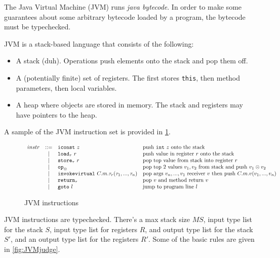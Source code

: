 \documentclass{article}
\begin{document}
The Java Virtual Machine (JVM) runs \textit{java bytecode}. In order to make some guarantees about some arbitrary bytecode loaded by a program, the bytecode must be typechecked.

\begin{definition}
JVM is a stack-based language that consists of the following:
\begin{itemize}
\item A stack (duh). Operations push elements onto the stack and pop them off.
\item A (potentially finite) set of registers. The first stores \texttt{this}, then method parameters, then local variables.
\item A heap where objects are stored in memory. The stack and registers may have pointers to the heap.
\end{itemize}
\end{definition}

A sample of the JVM instruction set is provided in \ref{fig:JVMinstr}.
\begin{figure}
\centering
$\begin{array}{r c l l}
instr{}
& ::= & \texttt{iconst} ~ z & \text{push \texttt{int} $z$ onto the stack} \\
& \mid & \texttt{load}_{\tau} ~ r & \text{push value in register $r$ onto the stack} \\
& \mid & \texttt{store}_{\tau} ~ r & \text{pop top value from stack into register $r$} \\
& \mid & \texttt{op}_{\otimes} & \text{pop top 2 values $v_1, v_2$ from stack and push $v_1 \otimes v_2$} \\
& \mid & \texttt{invokevirtual} ~ C . m . \tau_r (\tau_1, ..., \tau_n) & \text{pop args $v_n, ..., v_1$ receiver{} $v$ then push $C.m.v(v_1,...,v_n)$}  \\
& \mid & \texttt{return}_{\tau} & \text{pop $v$ and method return $v$} \\
& \mid & \texttt{goto} ~ l & \text{jump to program line $l$}
\end{array}$
\caption{JVM instructions}
\label{fig:JVMinstr}
\end{figure}

JVM instructions are typechecked. There's a max stack size $MS$, input type list for the stack $S$, input type list for registers $R$, and output type list for the stack $S'$, and an output type list for the registers $R'$. Some of the basic rules are given in \ref{fig:JVMjudge}.
\end{document}
